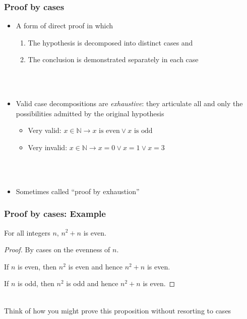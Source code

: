 \begin{frame}
  \frametitle{Proof by cases}
  \begin{itemize}
  \item A form of direct proof in which
    \begin{enumerate}
    \item The hypothesis is decomposed into distinct cases and
    \item The conclusion is demonstrated separately in each case
    \end{enumerate}
    \qquad\\\qquad\\
  \item Valid case decompositions are \textit{exhaustive}: they
    articulate all and only the possibilities admitted by the original
    hypothesis
    \begin{itemize}
    \item Very valid: $x\in\mathbb{N}\rightarrow x\text{ is even}\lor x\text{ is odd}$
    \item Very invalid: $x\in\mathbb{N}\rightarrow x=0\lor x=1\lor x=3$
    \end{itemize}
    \qquad\\\qquad\\
  \item Sometimes called ``proof by exhaustion''
  \end{itemize}
\end{frame}


\begin{frame}
  \frametitle{Proof by cases: Example}
  \begin{prop}
    For all integers $n$, $n^2+n$ is even.
  \end{prop}
  \begin{proof}
    By cases on the evenness of $n$.

    If $n$ is even, then $n^2$ is even and hence $n^2 +n$ is even.

    If $n$ is odd, then $n^2$ is odd and hence $n^2 +n$ is even.
  \end{proof}
  \qquad\\
   Think of how you might prove this proposition without
  resorting to cases
\end{frame}

